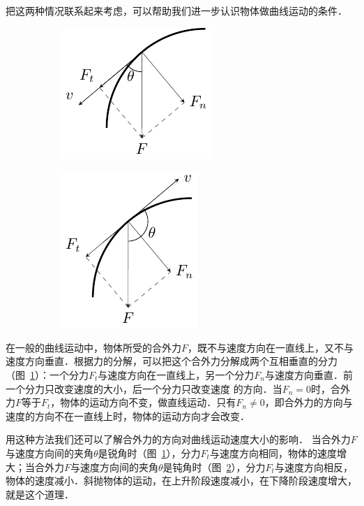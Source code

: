 把这两种情况联系起来考虑，可以帮助我们进一步认识物体做曲线运动的条件．
\begin{figure}[htbp]
    \centering
    \begin{subfigure} {0.4\linewidth} 
		\centering
		\includegraphics{fig/A/4-23a.pdf} 
		\caption{}\label{fig_A_4-23a} 
	\end{subfigure}
	\hfil
	\begin{subfigure} {0.4\linewidth} 
		\centering
		\includegraphics{fig/A/4-23b.pdf} 
		\caption{}\label{fig_A_4-23b} 
	\end{subfigure}
    \caption{}\label{fig_A_4-23}
\end{figure}

在一般的曲线运动中，物体所受的合外力$F$，既不与速度方向在一直线上，又不与速度方向垂直．根据力的分解，可以把这个合外力分解成两个互相垂直的分力（图~\ref{fig_A_4-23a}）：一个分力$F_t$与速度方向在一直线上，另一个分力$F_n$与速度方向垂直．前一个分力只改变速度的大小，后一个分力只改变速度
的方向．当$F_n=0$时，合外力$F$等于$F_t$，物体的运动方向不变，做直线运动．只有$F_n\ne 0$，即合外力的方向与速度的方向不在一直线上时，物体的运动方向才会改变．

用这种方法我们还可以了解合外力的方向对曲线运动速度大小的影响．
当合外力$F$与速度方向间的夹角$\theta$是锐角时（图~\ref{fig_A_4-23a}），分力$F_t$与速度方向相同，物体的速度增大；当合外力$F$与速度方向间的夹角$\theta$是钝角时（图~\ref{fig_A_4-23b}），分力$F_t$与速度方向相反，物体的速度减小．斜抛物体的运动，在上升阶段速度减小，在下降阶段速度增大，就是这个道理．


